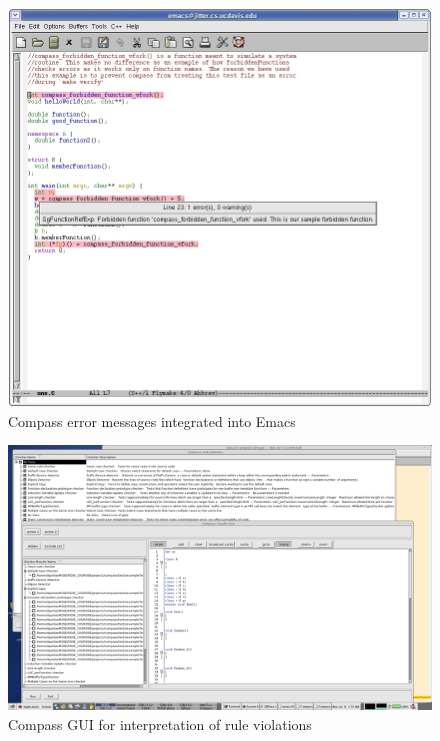 \begin{figure}
\includegraphics[width=7in]{emacs_screenshot.jpg}
\caption{Compass error messages integrated into Emacs}
\label{Compass_Emacs_Screenshot}
\end{figure}

\begin{figure}
\includegraphics[width=7in]{CompassScreenshot.pdf}
\caption{Compass GUI for interpretation of rule violations}
\label{Compass_GUI}
\end{figure}

